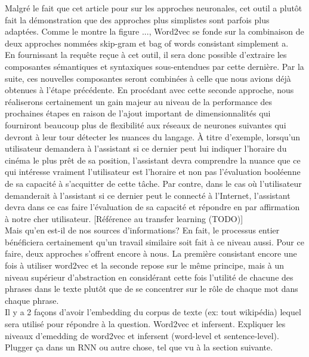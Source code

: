 \documentclass[11pt]{article}
\begin{document}
Malgré le fait que cet article pour sur les approches neuronales, cet outil a plutôt fait la démonstration que des approches plus simplistes sont parfois plus adaptées. Comme le montre la figure ..., Word2vec se fonde sur la combinaison de deux approches nommées skip-gram et bag of words consistant simplement a. \\


En fournissant la requête reçue à cet outil, il sera donc possible d'extraire les composantes sémantiques et syntaxiques sous-entendues par cette dernière. Par la suite, ces nouvelles composantes seront combinées à celle que nous avions déjà obtenues à l'étape précédente. En procédant avec cette seconde approche, nous réaliserons certainement un gain majeur au niveau de la performance des prochaines étapes en raison de l'ajout important de dimensionnalités qui fourniront beaucoup plus de flexibilité aux réseaux de neurones suivantes qui devront à leur tour détecter les nuances du langage. À titre d'exemple, lorsqu'un utilisateur demandera à l'assistant si ce dernier peut lui indiquer l'horaire du cinéma le plus prêt de sa position, l'assistant devra comprendre la nuance que ce qui intéresse vraiment l'utilisateur est l'horaire et non pas l'évaluation booléenne de sa capacité à s'acquitter de cette tâche. Par contre, dans le cas où l'utilisateur demanderait à l'assistant si ce dernier peut le connecté à l'Internet, l'assistant devra dans ce cas faire l'évaluation de sa capacité et répondre en par affirmation à notre cher utilisateur. [Référence au transfer learning (TODO)] \\

Mais qu'en est-il de nos sources d'informations? En fait, le processus entier bénéficiera certainement qu'un travail similaire soit fait à ce niveau aussi. Pour ce faire, deux approches s'offrent encore à nous. La première consistant encore une fois à utiliser word2vec et la seconde repose sur le même principe, mais à un niveau supérieur d'abstraction en considérant cette fois l'utilité de chacune des phrases dans le texte plutôt que de se concentrer sur le rôle de chaque mot dans chaque phrase.  \\

Il y a 2 façons d’avoir l’embedding du corpus de texte (ex: tout wikipédia) lequel sera utilisé pour répondre à la question. Word2vec et infersent. Expliquer les niveaux d’emedding de word2vec et infersent (word-level et sentence-level). Plugger ça dans un RNN ou autre chose, tel que vu à la section suivante.
\end{document}
